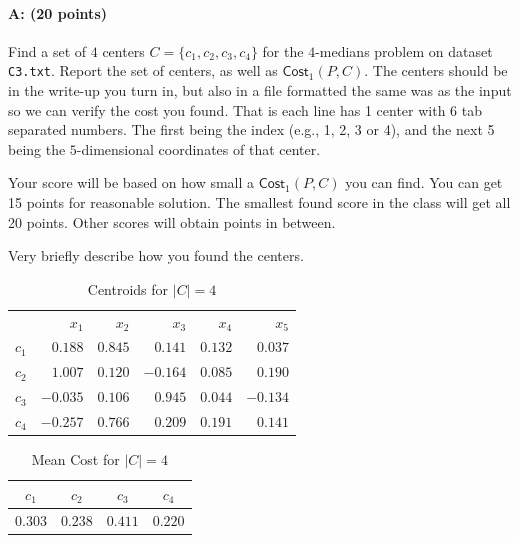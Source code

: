 \documentclass[11pt]{article}
\begin{document}
\paragraph{A: (20 points)}
Find a set of $4$ centers $C = \{c_1, c_2, c_3, c_4\}$ for the $4$-medians problem on dataset \texttt{C3.txt}.  Report the set of centers, as well as $\textsf{Cost}_1(P,C)$.  The centers should be in the write-up you turn in, but also in a file formatted the same was as the input so we can verify the cost you found.  That is each line has 1 center with 6 tab separated numbers.  The first being the index (e.g., 1, 2, 3 or 4), and the next 5 being the $5$-dimensional coordinates of that center.  

Your score will be based on how small a $\textsf{Cost}_1(P,C)$ you can find.   You can get 15 points for reasonable solution.  The smallest found score in the class will get all 20 points.  Other scores will obtain points in between.  

Very briefly describe how you found the centers.  


\begin{table}[H]
\centering
\caption{Centroids for $\left| C \right| = 4$}
\begin{tabular}{c | r r r r r}
\hline\hline
 & $x_{1}$ & $x_{2}$ & $x_{3}$ & $x_{4}$ & $x_{5}$\\
$c_{1}$ & $0.188$ & $0.845$ & $0.141$ & $0.132$ & $0.037$\\
$c_{2}$ & $1.007$ & $0.120$ & $-0.164$ & $0.085$ & $0.190$\\
$c_{3}$ & $-0.035$ & $0.106$ & $0.945$ & $0.044$ & $-0.134$\\
$c_{4}$ & $-0.257$ & $0.766$ & $0.209$ & $0.191$ & $0.141$\\
\hline
\end{tabular}
\end{table}

\begin{table}[H]
\centering
\caption{Mean Cost for $\left| C \right| = 4$}
\begin{tabular}{c c c c}
\hline\hline
$c_{1}$ & $c_{2}$ & $c_{3}$ & $c_{4}$\\
\hline
$0.303$ & $0.238$ & $0.411$ & $0.220$\\
\hline
\end{tabular}
\end{table}
\end{document}
